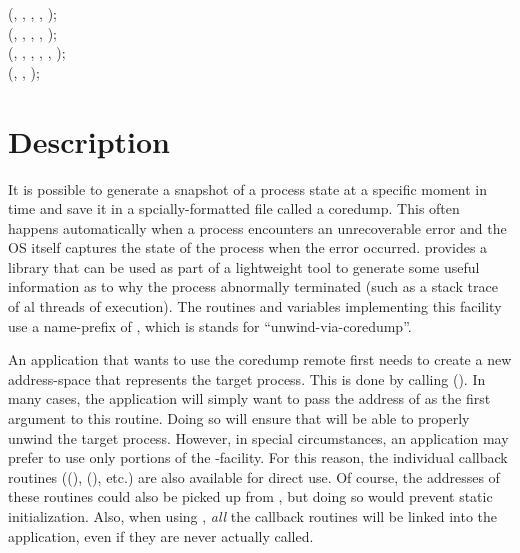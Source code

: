 \documentclass{article}
\begin{document}
\noindent
{} (, , , , );\\

\noindent
{} (, , , , );\\

\noindent
{} (, , , , , );\\

\noindent
{} (, , );\\

\section{Description}

It is possible to generate a snapshot of a process state at a specific moment in
time and save it in a spcially-formatted file called a coredump.
This often happens automatically when a process encounters an unrecoverable
error and the OS itself captures the state of the process when the error
occurred.
 provides a library that can be used as part of a lightweight
tool to generate some useful information as to why the process abnormally
terminated (such as a stack trace of al threads of execution).
The routines and variables
implementing this facility use a name-prefix of , which is
stands for ``unwind-via-coredump''.

An application that wants to use the coredump remote first needs
to create a new  address-space that represents the
target process.  This is done by calling
().  In many cases, the application
will simply want to pass the address of  as the
first argument to this routine.  Doing so will ensure that
 will be able to properly unwind the target process.
However, in special circumstances, an application may prefer to use
only portions of the -facility.  For this reason, the
individual callback routines ((),
(), etc.)  are also available for direct
use.  Of course, the addresses of these routines could also be picked
up from , but doing so would prevent static
initialization.  Also, when using , \emph{all}
the callback routines will be linked into the application, even if
they are never actually called.
\end{document}
